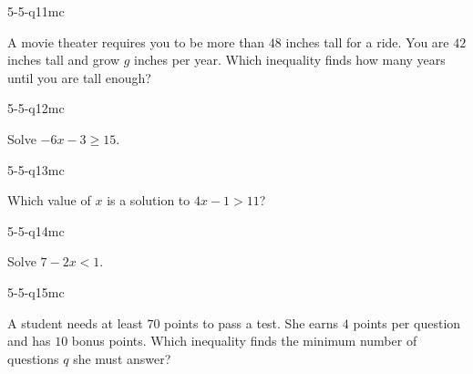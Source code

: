 \begin{practiceQuestion}{5-5-q11}{mc}
\begin{questionText}
A movie theater requires you to be more than $48$ inches tall for a ride. You are $42$ inches tall and grow $g$ inches per year. Which inequality finds how many years until you are tall enough?
\end{questionText}
\end{practiceQuestion}

\begin{practiceQuestion}{5-5-q12}{mc}
\begin{questionText}
Solve $-6x - 3 \geq 15$.
\end{questionText}
\end{practiceQuestion}

\begin{practiceQuestion}{5-5-q13}{mc}
\begin{questionText}
Which value of $x$ is a solution to $4x - 1 > 11$?
\end{questionText}
\end{practiceQuestion}

\begin{practiceQuestion}{5-5-q14}{mc}
\begin{questionText}
Solve $7 - 2x < 1$.
\end{questionText}
\end{practiceQuestion}

\begin{practiceQuestion}{5-5-q15}{mc}
\begin{questionText}
A student needs at least $70$ points to pass a test. She earns $4$ points per question and has $10$ bonus points. Which inequality finds the minimum number of questions $q$ she must answer?
\end{questionText}
\end{practiceQuestion}

